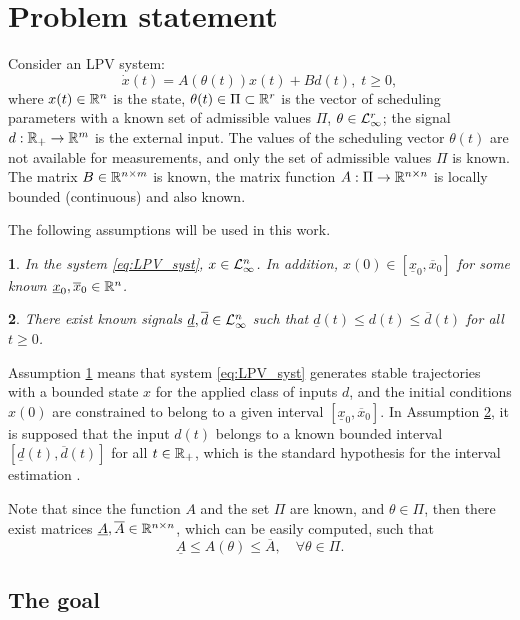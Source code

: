 \documentclass[letterpaper, 10 pt, conference]{ieeeconf}
\theoremstyle{plain}
\theoremstyle{definition}
\theoremstyle{plain}
\newtheorem{assumption}{\protect\assumptionname}
\theoremstyle{plain}
\theoremstyle{remark}
\providecommand{\assumptionname}{Assumption}
\begin{document}
\section{\label{sec:Problem-statement} Problem statement}

Consider an LPV system:
\begin{equation}
\dot{x}(t)=A(\theta(t))x(t)+Bd(t),\;t\geq0,\label{eq:LPV_syst}
\end{equation}
where $x(t)\in\mathbb{R}^{n}$ is the state, $\theta(t)\in\Pi\subset\mathbb{R}^{r}$ is the vector of scheduling parameters with a known set of admissible values $\Pi$, $\theta\in\mathcal{L}_{\infty}^{r}$; the signal $d:\mathbb{R}_{+}\to\mathbb{R}^{m}$ is the external input. The values of the scheduling vector $\theta(t)$ are not available for measurements, and only the set of admissible values $\Pi$ is known. The matrix $B\in\mathbb{R}^{n\times m}$ is known, the matrix function $A:\Pi\to\mathbb{R}^{n\times n}$ is locally bounded (continuous) and also known.

The following assumptions will be used in this work.
\begin{assumption}
\label{ass:a1} In the system \eqref{eq:LPV_syst}, $x\in\mathcal{L}_{\infty}^{n}$. In addition, $x(0)\in[\underline{x}_{0},\overline{x}_{0}]$ for some known $\underline{x}_{0},\overline{x}_{0}\in\mathbb{R}^{n}$.
\end{assumption}

\begin{assumption}
\label{ass:a2} There exist known signals $\underline{d},\overline{d}\in\mathcal{L}_{\infty}^{n}$ such that $\underline{d}(t)\leq d(t)\leq\overline{d}(t)$ for all $t\geq0$.
\end{assumption}
Assumption \ref{ass:a1} means that system \eqref{eq:LPV_syst} generates stable trajectories with a bounded state $x$ for the applied class of inputs $d$, and the initial conditions $x(0)$ are constrained to belong to a given interval $[\underline{x}_{0},\overline{x}_{0}]$. In Assumption \ref{ass:a2}, it is supposed that the input $d(t)$ belongs to a known bounded interval $[\underline{d}(t),\overline{d}(t)]$ for all $t\in\mathbb{R}_{+}$, which is the standard hypothesis for the interval estimation \cite{Efimov2016,Raiessi2018}.

Note that since the function $A$ and the set $\Pi$ are known, and $\theta\in\Pi$, then there exist matrices $\underline{A},\overline{A}\in\mathbb{R}^{n\times n}$, which can be easily computed, such that 
\[
\underline{A}\leq A(\theta)\leq\overline{A},\quad\forall\theta\in\Pi.
\]

\subsection{The goal}
\end{document}
